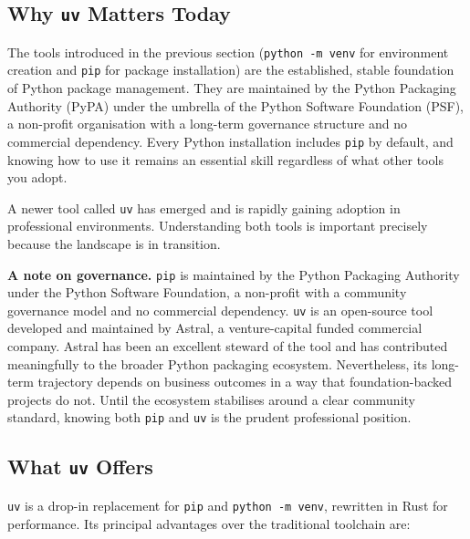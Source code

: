 \subsection{Why \texttt{uv} Matters Today}

The tools introduced in the previous section (\texttt{python -m venv}
for environment creation and \texttt{pip} for package
installation) are the established, stable foundation of Python package
management. They are maintained by the Python Packaging Authority
(PyPA) under the umbrella of the Python Software Foundation (PSF), a
non-profit organisation with a long-term governance structure and no
commercial dependency. Every Python installation includes \texttt{pip}
by default, and knowing how to use it remains an essential skill
regardless of what other tools you adopt.

A newer tool called \texttt{uv} has emerged and is rapidly gaining
adoption in professional environments. Understanding both tools is
important precisely because the landscape is in transition.

\begin{infobox}
\textbf{A note on governance.} \texttt{pip} is maintained by the
Python Packaging Authority under the Python Software Foundation, a
non-profit with a community governance model and no commercial
dependency. \texttt{uv} is an open-source tool developed and
maintained by Astral, a venture-capital funded commercial company.
Astral has been an excellent steward of the tool and has contributed
meaningfully to the broader Python packaging ecosystem. Nevertheless,
its long-term trajectory depends on business outcomes in a way that
foundation-backed projects do not. Until the ecosystem stabilises
around a clear community standard, knowing both \texttt{pip} and
\texttt{uv} is the prudent professional position.
\end{infobox}

\subsection{What \texttt{uv} Offers}

\texttt{uv} is a drop-in replacement for \texttt{pip} and
\texttt{python -m venv}, rewritten in Rust for performance. Its
principal advantages over the traditional toolchain are:

